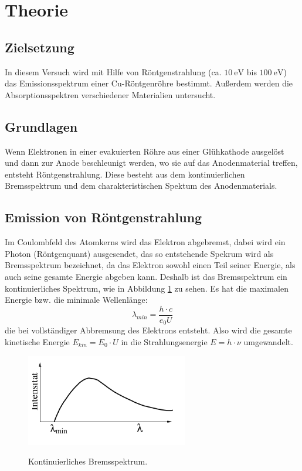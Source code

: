 \section{Theorie}
\label{sec:Theorie}
\subsection{Zielsetzung}
In diesem Versuch wird mit Hilfe von Röntgenstrahlung (ca. $\SI{10}{\eV}$ bis $\SI{100}{\eV}$)
das Emissionsspektrum einer
Cu-Röntgenröhre bestimmt. Außerdem werden die Absorptionsspektren verschiedener
Materialien untersucht.

\subsection{Grundlagen}
Wenn Elektronen in einer evakuierten Röhre aus einer Glühkathode ausgelöst und
dann zur Anode beschleunigt werden, wo sie auf das Anodenmaterial treffen, entsteht
Röntgenstrahlung. Diese besteht aus dem kontinuierlichen Bremsspektrum und dem
charakteristischen Spektum des Anodenmaterials.

\subsection{Emission von Röntgenstrahlung}

Im Coulombfeld des Atomkerns wird das Elektron abgebremst, dabei wird ein
Photon (Röntgenquant) ausgesendet, das so entstehende Spekrum wird als Bremsspektrum
bezeichnet, da das Elektron sowohl einen Teil seiner Energie, als auch
seine gesamte Energie abgeben kann. Deshalb ist das Bremsspektrum ein kontinuierliches
Spektrum, wie in Abbildung \ref{fig:kont} zu sehen. Es hat die maximalen Energie bzw. die minimale Wellenlänge:
\begin{equation}
  \lambda_{min}=\frac{h\cdot c}{e_0 U}
  \label{eqn:lamdbamin}
\end{equation}
die bei vollständiger Abbremsung des Elektrons entsteht. Also wird die gesamte
kinetische Energie $E_{kin}=E_{0} \cdot U$ in die  Strahlungsenergie $E=h\cdot \nu$
umgewandelt.
\begin{figure}
  \centering
  \includegraphics[height=4cm]{kont.png}
  \caption{Kontinuierliches Bremsspektrum.}
  \label{fig:kont}
  \cite{skript}
\end{figure}

